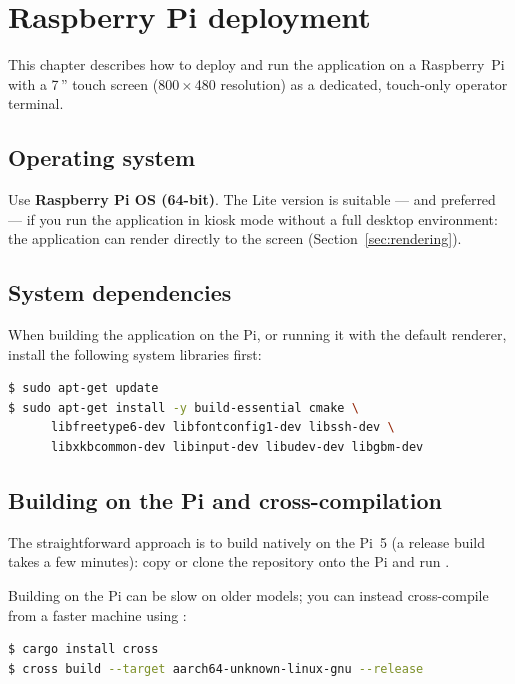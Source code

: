 \chapter{Raspberry Pi deployment}
\label{ch:rpi}

This chapter describes how to deploy and run the \appname{} application on a
Raspberry~Pi with a 7\,'' touch screen (800\,$\times$\,480 resolution) as a
dedicated, touch-only operator terminal.

\section{Operating system}

Use \textbf{Raspberry Pi OS (64-bit)}. The Lite version is suitable --- and
preferred --- if you run the application in kiosk mode without a full desktop
environment: the application can render directly to the screen
(Section~\ref{sec:rendering}).

\section{System dependencies}

When building the application on the Pi, or running it with the default renderer,
install the following system libraries first:

\begin{lstlisting}[language=bash]
$ sudo apt-get update
$ sudo apt-get install -y build-essential cmake \
      libfreetype6-dev libfontconfig1-dev libssh-dev \
      libxkbcommon-dev libinput-dev libudev-dev libgbm-dev
\end{lstlisting}

\section{Building on the Pi and cross-compilation}

The straightforward approach is to build natively on the Pi~5 (a release build takes
a few minutes): copy or clone the repository onto the Pi and run
\code{cargo build --release}.

Building on the Pi can be slow on older models; you can instead cross-compile from a
faster machine using :

\begin{lstlisting}[language=bash]
$ cargo install cross
$ cross build --target aarch64-unknown-linux-gnu --release
\end{lstlisting}

